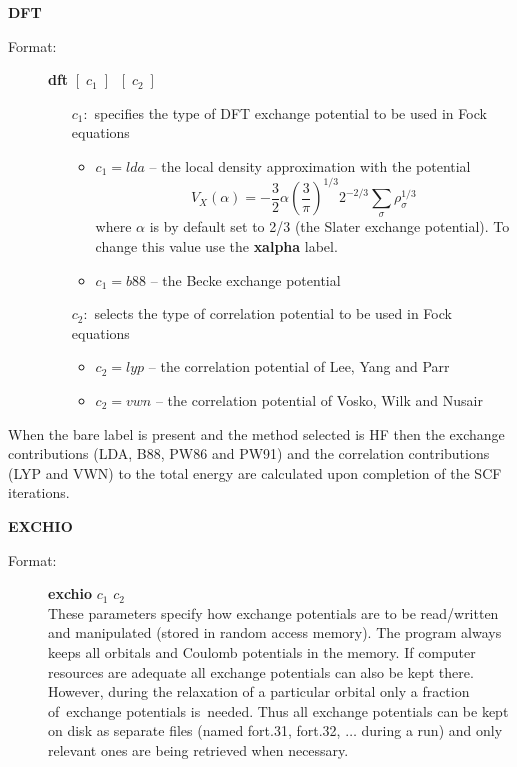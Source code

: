 \documentclass[12pt,a4paper]{article}
\begin{document}
\begin{description}
\item \textbf{DFT}
\begin{description} 
\item[Format:] \textbf{dft}  $[\;c_1\;]\;\; [\;c_2\;]$ \\
\begin{itemize}
\item[$c_1:$] specifies the type of DFT exchange potential to be used in
  Fock equations 
\begin{itemize}
\item $c_1=lda$ -- the local density approximation with the potential 
\begin{equation*} 
         V_X(\alpha)=-\frac{3}{2} \alpha \left(\frac{3}{\pi}\right)^{1/3} 2^{-2/3} 
                \sum_{\sigma} \rho_{\sigma}^{1/3}
\end{equation*}
where $\alpha$ is by default set to 2/3 (the Slater exchange
potential). To change this value use the \textbf{xalpha} label. 

\item $c_1=b88$ -- the Becke exchange potential

\end{itemize} 

\item[$c_2:$] selects the type of correlation potential to be used in
  Fock equations

\begin{itemize} 
\item $c_2=lyp$ -- the correlation potential of Lee, Yang and Parr 

\item $c_2=vwn$ -- the correlation potential of Vosko, Wilk and Nusair
\end{itemize} 
\end{itemize} 
\end{description} 
When the bare label is present and the method selected is HF then the
exchange contributions (LDA, B88, PW86 and PW91) and the correlation
contributions (LYP and VWN) to the total energy are calculated upon
completion of the SCF iterations.

\item \textbf{EXCHIO} 
\begin{description} 
\item[Format:] \textbf{exchio} $c_1$ $c_2$\\ These parameters specify how exchange
  potentials are to be read/written and manipulated (stored in random access memory). The
  program always keeps all orbitals and Coulomb potentials in the memory. If computer
  resources are adequate all exchange potentials can also be kept there. However, during
  the relaxation of a particular orbital only a fraction of~exchange potentials
  is~needed. Thus all exchange potentials can be kept on disk as separate files (named
  fort.31, fort.32, $\ldots$ during a run) and only relevant ones are being retrieved when
  necessary.


\end{description}
\end{description}
\end{document}
